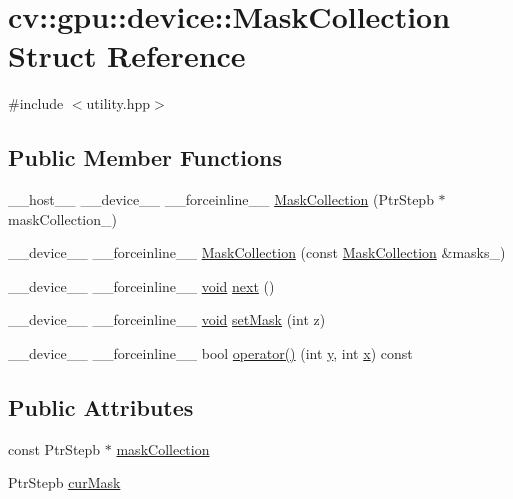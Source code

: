 \hypertarget{structcv_1_1gpu_1_1device_1_1MaskCollection}{\section{cv\-:\-:gpu\-:\-:device\-:\-:Mask\-Collection Struct Reference}
\label{structcv_1_1gpu_1_1device_1_1MaskCollection}
}


{\ttfamily \#include $<$utility.\-hpp$>$}

\subsection*{Public Member Functions}
\begin{DoxyCompactItemize}
\item 
\-\_\-\-\_\-host\-\_\-\-\_\- \-\_\-\-\_\-device\-\_\-\-\_\- \-\_\-\-\_\-forceinline\-\_\-\-\_\- \hyperlink{structcv_1_1gpu_1_1device_1_1MaskCollection_aee65a91ef20f415d8b773693abb9982a}{Mask\-Collection} (Ptr\-Stepb $\ast$mask\-Collection\-\_\-)
\item 
\-\_\-\-\_\-device\-\_\-\-\_\- \-\_\-\-\_\-forceinline\-\_\-\-\_\- \hyperlink{structcv_1_1gpu_1_1device_1_1MaskCollection_a1c1c0249f5330a810530328edc4324dc}{Mask\-Collection} (const \hyperlink{structcv_1_1gpu_1_1device_1_1MaskCollection}{Mask\-Collection} \&masks\-\_\-)
\item 
\-\_\-\-\_\-device\-\_\-\-\_\- \-\_\-\-\_\-forceinline\-\_\-\-\_\- \hyperlink{legacy_8hpp_a8bb47f092d473522721002c86c13b94e}{void} \hyperlink{structcv_1_1gpu_1_1device_1_1MaskCollection_ab823553cd2a2c284ec8e64407a5c44f7}{next} ()
\item 
\-\_\-\-\_\-device\-\_\-\-\_\- \-\_\-\-\_\-forceinline\-\_\-\-\_\- \hyperlink{legacy_8hpp_a8bb47f092d473522721002c86c13b94e}{void} \hyperlink{structcv_1_1gpu_1_1device_1_1MaskCollection_a3aa8aff9cd1693d7661637330415e1e2}{set\-Mask} (int z)
\item 
\-\_\-\-\_\-device\-\_\-\-\_\- \-\_\-\-\_\-forceinline\-\_\-\-\_\- bool \hyperlink{structcv_1_1gpu_1_1device_1_1MaskCollection_a6c22cd8a3efe3f1173f43cb495be06ff}{operator()} (int \hyperlink{highgui__c_8h_af1202c02b14870c18fb3a1da73e9e7c7}{y}, int \hyperlink{highgui__c_8h_a6150e0515f7202e2fb518f7206ed97dc}{x}) const 
\end{DoxyCompactItemize}
\subsection*{Public Attributes}
\begin{DoxyCompactItemize}
\item 
const Ptr\-Stepb $\ast$ \hyperlink{structcv_1_1gpu_1_1device_1_1MaskCollection_a1eb17aec83f21018c46f5baa0c57350f}{mask\-Collection}
\item 
Ptr\-Stepb \hyperlink{structcv_1_1gpu_1_1device_1_1MaskCollection_a14ec0d2979261188a2214da2582d1560}{cur\-Mask}
\end{DoxyCompactItemize}


